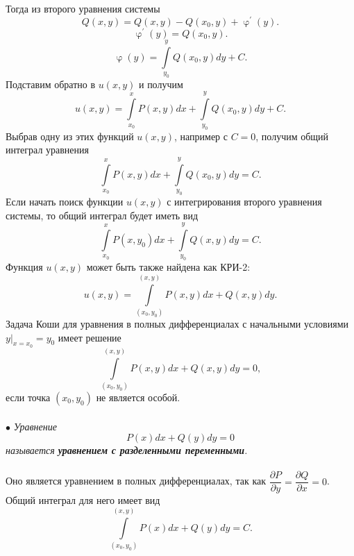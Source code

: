 \documentclass[a4paper, 12pt]{report}
\renewcommand{\varphi}{\upvarphi}
\renewcommand{\d}{\partial}
\begin{document}
Тогда из второго уравнения системы $$Q(x,y) = Q(x,y) - Q(x_0,y) + \varphi^\prime(y).$$
$$\varphi^\prime(y) = Q(x_0,y).$$
$$\varphi(y) = \int\limits_{y_0}^y Q(x_0,y)dy + C.$$
Подставим обратно в $u(x,y)$ и получим $$u(x,y) =\int\limits^x_{x_0}P(x,y)dx  +  \int\limits_{y_0}^y Q(x_0,y)dy + C.$$
Выбрав одну из этих функций $u(x,y)$, например с $C = 0$, получим общий интеграл уравнения $$\int\limits^x_{x_0}P(x,y)dx  +  \int\limits_{y_0}^y Q(x_0,y)dy = C.$$
Если начать поиск функции $u(x,y)$ с интегрирования второго уравнения системы, то общий интеграл будет иметь вид $$\int\limits^x_{x_0}P(x,y_0)dx  +  \int\limits_{y_0}^y Q(x,y)dy = C.$$
Функция $u(x,y)$ может быть также найдена как КРИ-2: $$u(x,y) = \int\limits_{(x_0,y_0)}^{(x,y)}P(x,y)dx + Q(x,y) dy.$$
Задача Коши для уравнения в полных дифференциалах с начальными условиями $y|_{x=x_0} = y_0$ имеет решение $$\int\limits_{(x_0,y_0)}^{(x,y)}P(x,y)dx + Q(x,y) dy = 0,$$
если точка $(x_0,y_0)$ не является особой.\\\\
$\bullet$ \textit{Уравнение $$P(x)dx + Q(y)dy = 0$$ называется \textbf{уравнением с разделенными переменными}.}\\\\
Оно является уравнением в полных дифференциалах, так как $\dfrac{\d P}{\d y} = \dfrac{\d Q}{\d x} = 0$. Общий интеграл для него имеет вид $$\int\limits_{(x_0,y_0)}^{(x,y)}P(x)dx + Q(y) dy = C.$$
\end{document}

